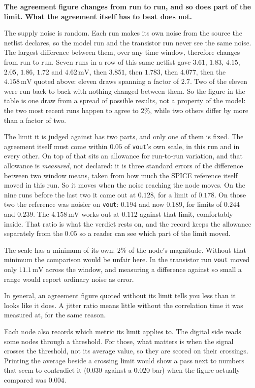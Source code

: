 \documentclass[11pt,a4paper]{article}
\newcommand{\unit}[1]{\,\textrm{#1}}
\begin{document}
\textbf{The agreement figure changes from run to run, and so does
part of the limit. What the agreement itself has to beat does not.}

The supply noise is random. Each run makes its own noise from the
source the netlist declares, so the model run and the transistor run
never see the same noise. The largest difference between them, over
any time window, therefore changes from run to run. Seven runs in a
row of this same netlist gave $3.61$, $1.83$, $4.15$, $2.05$, $1.86$,
$1.72$ and $4.62\unit{mV}$, then $3.851$, then $1.783$, then $4.077$,
then the $4.158\unit{mV}$ quoted above: eleven draws spanning a factor
of $2.7$. Two of the eleven were run back to back with nothing changed
between them. So the figure in the table is one draw from a spread of
possible results, not a property of the model: the two most recent runs
happen to agree to $2\%$, while two others differ by more than a factor
of two.

The limit it is judged against has two parts, and only one of them is
fixed. The agreement itself must come within $0.05$ of
\texttt{vout}'s own scale, in this run and in every other. On top of
that sits an allowance for run-to-run variation, and that allowance is
\emph{measured}, not declared: it is three standard errors of the
difference between two window means, taken from how much the SPICE
reference itself moved in this run. So it moves when the noise
reaching the node moves. On the nine runs before the last two it came
out at $0.128$, for a limit of $0.178$. On those two the reference was
noisier on \texttt{vout}: $0.194$ and now $0.189$, for limits of
$0.244$ and $0.239$. The $4.158\unit{mV}$ works out at $0.112$ against
that limit,
comfortably inside. That ratio is what the verdict rests on, and the
record keeps the allowance separately from the $0.05$ so a reader can
see which part of the limit moved.

The scale has a minimum of its own: $2\%$ of the node's magnitude.
Without that minimum the comparison would be unfair here. In the
transistor run \texttt{vout} moved only $11.1\unit{mV}$ across the
window, and measuring a difference against so small a range would
report ordinary noise as error.

In general, an agreement figure quoted without its limit tells you
less than it looks like it does. A jitter ratio means little without
the correlation time it was measured at, for the same reason.

\medskip
\noindent Each node also records which metric its limit applies to.
The digital side reads some nodes through a threshold. For those, what
matters is when the signal crosses the threshold, not its average
value, so they are scored on their crossings. Printing the average
beside a crossing limit would show a pass next to numbers that seem to
contradict it ($0.030$ against a $0.020$ bar) when the figure actually
compared was $0.004$.
\end{document}
